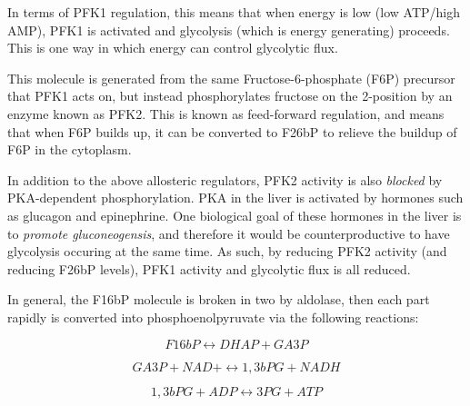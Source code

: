 \documentclass{tufte-handout}
\begin{document}
  In terms of PFK1 regulation, this means that when energy is low (low ATP/high AMP), PFK1 is activated and glycolysis (which is energy generating) proceeds.  This is one way in which energy can control glycolytic flux.

  This molecule is generated from the same Fructose-6-phosphate (F6P) precursor that PFK1 acts on, but instead phosphorylates fructose on the 2-position by an enzyme known as PFK2.  This is known as feed-forward regulation, and means that when F6P builds up, it can be converted to F26bP to relieve the buildup of F6P in the cytoplasm.

  In addition to the above allosteric regulators, PFK2 activity is also \emph{blocked} by PKA-dependent phosphorylation.  PKA in the liver is activated by hormones such as glucagon and epinephrine.  One biological goal of these hormones in the liver is to \emph{promote gluconeogensis}, and therefore it would be counterproductive to have glycolysis occuring at the same time.  As such, by reducing PFK2 activity (and reducing F26bP levels), PFK1 activity and glycolytic flux is all reduced.

  In general, the F16bP molecule is broken in two by aldolase, then each part rapidly is converted into phosphoenolpyruvate via the following reactions:

\begin{equation}\label{eq:aldolase-a}
F16bP \leftrightarrow DHAP+ GA3P
\end{equation}

\begin{equation}\label{eq:g3pdh}
GA3P + NAD+ \leftrightarrow 1,3bPG  + NADH
\end{equation}

\begin{equation}\label{eq:pgk}
1,3bPG + ADP \leftrightarrow 3PG + ATP
\end{equation}
\end{document}
